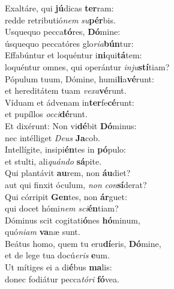 \evenverse Exaltáre, qui \textbf{jú}dicas \textbf{ter}ram:~\*\\
\evenverse redde retributió\textit{nem} \textit{su}\textbf{pér}bis.\\
\oddverse Usquequo pecca\textbf{tó}res, \textbf{Dó}mine:~\*\\
\oddverse úsquequo peccatóres glo\textit{ri}\textit{a}\textbf{bún}tur:\\
\evenverse Effabúntur et loquéntur i\textbf{ni}qui\textbf{tá}tem:~\*\\
\evenverse loquéntur omnes, qui operántur \textit{in}\textit{ju}\textbf{stí}tiam?\\
\oddverse Pópulum tuum, Dómine, humi\textbf{li}a\textbf{vé}runt:~\*\\
\oddverse et hereditátem tuam \textit{ve}\textit{xa}\textbf{vé}runt.\\
\evenverse Víduam et ádvenam in\textbf{ter}fe\textbf{cé}runt:~\*\\
\evenverse et pupíllos \textit{oc}\textit{ci}\textbf{dé}runt.\\
\oddverse Et dixérunt: Non vi\textbf{dé}bit \textbf{Dó}minus:~\*\\
\oddverse nec intélliget \textit{De}\textit{us} \textbf{Ja}cob.\\
\evenverse Intellígite, insipi\textbf{én}tes in \textbf{pó}pulo:~\*\\
\evenverse et stulti, ali\textit{quán}\textit{do} \textbf{sá}pite.\\
\oddverse Qui plantávit \textbf{au}rem, non \textbf{áu}diet?~\*\\
\oddverse aut qui finxit óculum, \textit{non} \textit{con}\textbf{sí}derat?\\
\evenverse Qui córripit \textbf{Gen}tes, non \textbf{ár}guet:~\*\\
\evenverse qui docet hómi\textit{nem} \textit{sci}\textbf{én}tiam?\\
\oddverse Dóminus scit cogitati\textbf{ó}nes \textbf{hó}minum,~\*\\
\oddverse quó\textit{ni}\textit{am} \textbf{va}næ sunt.\\
\evenverse Beátus homo, quem tu eru\textbf{dí}eris, \textbf{Dó}mine,~\*\\
\evenverse et de lege tua docú\textit{e}\textit{ris} \textbf{e}um.\\
\oddverse Ut mítiges ei a di\textbf{é}bus \textbf{ma}lis:~\*\\
\oddverse donec fodiátur pecca\textit{tó}\textit{ri} \textbf{fó}vea.\\
